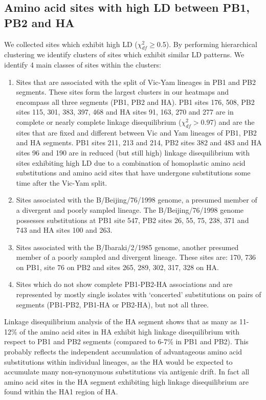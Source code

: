 \documentclass[11pt,oneside,letterpaper]{article}
\begin{document}
\subsection*{Amino acid sites with high LD between PB1, PB2 and HA}
We collected sites which exhibit high LD ($\chi^{2}_{df}\ge$0.5).
By performing hierarchical clustering we identify clusters of sites which exhibit similar LD patterns.
We identify 4 main classes of sites within the clusters:
\begin{enumerate}
	\item Sites that are associated with the split of Vic-Yam lineages in PB1 and PB2 segments.
	These sites form the largest clusters in our heatmaps and encompass all three segments (PB1, PB2 and HA).
	PB1 sites 176, 508, PB2 sites 115, 301, 383, 397, 468 and HA sites 91, 163, 270 and 277 are in complete or nearly complete linkage disequilibrium ($\chi^{2}_{df}>$0.97) and are the sites that are fixed and different between Vic and Yam lineages of PB1, PB2 and HA segments.
	PB1 sites 211, 213 and 214, PB2 sites 382 and 483 and HA sites 96 and 190 are in reduced (but still high) linkage disequilibrium with sites exhibiting high LD due to a combination of homoplastic amino acid substitutions and amino acid sites that have undergone substitutions some time after the Vic-Yam split.
	\item Sites associated with the B/Beijing/76/1998 genome, a presumed member of a divergent and poorly sampled lineage.
	The B/Beijing/76/1998 genome possesses substitutions at PB1 site 547, PB2 sites 26, 55, 75, 238, 371 and 743 and HA sites 100 and 263.
	\item Sites associated with the B/Ibaraki/2/1985 genome, another presumed member of a poorly sampled and divergent lineage.
	These sites are: 170, 736 on PB1, site 76 on PB2 and sites 265, 289, 302, 317, 328 on HA.
	\item Sites which do not show complete PB1-PB2-HA associations and are represented by mostly single isolates with `concerted' substitutions on pairs of segments (PB1-PB2, PB1-HA or PB2-HA), but not all three.
\end{enumerate}


Linkage disequilibrium analysis of the HA segment shows that as many as 11-12\% of the amino acid sites in HA exhibit high linkage disequilibrium with respect to PB1 and PB2 segments (compared to 6-7\% in PB1 and PB2).
This probably reflects the independent accumulation of advantageous amino acid substitutions within individual lineages, as the HA would be expected to accumulate many non-synonymous substitutions via antigenic drift.
In fact all amino acid sites in the HA segment exhibiting high linkage disequilibrium are found within the HA1 region of HA.
\end{document}
